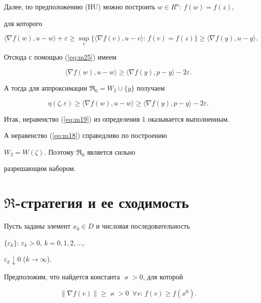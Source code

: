 Далее, по предположению (HU) можно построить $w \in R^{n}: \, f(w)=f(z)$,


для которого


$$


\langle \nabla f(w),u-w \rangle + \varepsilon \geq


\sup_{v} \{ \langle \nabla f(v),u-v \rangle : \, f(v)=f(z) \} \geq


\langle \nabla f(y),u-y \rangle.


$$


Отсюда с помощью (\ref{eq:m25}) имеем


$$


\langle \nabla f(w),u-w \rangle \geq


\langle \nabla f(y),p-y\rangle -2\varepsilon.


$$ 


А тогда для аппроксимации $\Re_{0}=W_{2} \cup \{ y \}$ получаем


$$


\eta(\zeta,\varepsilon) \geq \langle \nabla f(w),u-w \rangle \geq


\langle \nabla f(y),p-y\rangle -2\varepsilon .


$$


Итак, неравенство (\ref{eq:m19}) из определения 1 оказывается выполненным.


А неравенство (\ref{eq:m18}) справедливо по построению


$W_{2}=W(\zeta)$. Поэтому $\Re_{0}$ является сильно


разрешающим набором.





\section{$\Re$-стратегия и ее сходимость}





Пусть заданы элемент $x_{0} \in D$ и числовая последовательность 


$\{ \varepsilon_{k} \}: \,


\varepsilon_{k}>0$, $k=0,1,2,\dotsc$,


$\varepsilon_{k} \downarrow 0$ ($k \rightarrow \infty$).


Предположим, что найдется константа $\varkappa> 0$, для которой 


\begin{equation}


\| \nabla f(v) \| \geq \varkappa >0 \ \; \forall v: \,


f(v) \geq f(x^{0}). 


\label{eq:m26}


\end{equation}





